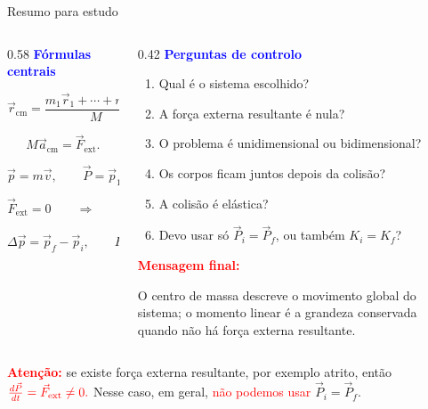 \documentclass{beamer}
\begin{document}
	
	\begin{frame}{Resumo para estudo}
		\scriptsize
		
		\begin{columns}[T]
			\begin{column}{0.58\textwidth}
				\textcolor{blue}{\textbf{Fórmulas centrais}}
				
				\[
				\vec r_{\text{cm}}=
				\frac{m_1\vec r_1+\cdots+m_n\vec r_n}{M},
				\qquad
				M=m_1+\cdots+m_n.
				\]
				
				\[
				M\vec a_{\text{cm}}=\vec F_{\text{ext}}.
				\]
				
				\[
				\vec p=m\vec v,
				\qquad
				\vec P=\vec p_1+\cdots+\vec p_n=M\vec v_{\text{cm}}.
				\]
				
				\[
				\vec F_{\text{ext}}=0
				\qquad \Rightarrow \qquad
				\vec P_i=\vec P_f.
				\]
				
				\[
				\Delta \vec p=\vec p_f-\vec p_i,
				\qquad
				F=\frac{\Delta p}{\Delta t}.
				\]
			\end{column}
			
			\begin{column}{0.42\textwidth}
				\textcolor{blue}{\textbf{Perguntas de controlo}}
				
				\begin{enumerate}
					\item Qual é o sistema escolhido?
					\item A força externa resultante é nula?
					\item O problema é unidimensional ou bidimensional?
					\item Os corpos ficam juntos depois da colisão?
					\item A colisão é elástica?
					\item Devo usar só \(\vec P_i=\vec P_f\), ou também \(K_i=K_f\)?
				\end{enumerate}
				
				\vspace{0.15cm}
				
				\textcolor{red}{\textbf{Mensagem final:}}
				
				O centro de massa descreve o movimento global do sistema; o momento linear é a grandeza conservada quando não há força externa resultante.
			\end{column}
		\end{columns}
		
		\vspace{0.3cm}
		
		{
			\textcolor{red}{\textbf{Atenção:}}
			se existe força externa resultante, por exemplo atrito, então
			$
			\textcolor{red}{
				\frac{d\vec P}{dt}=\vec F_{\text{ext}}\neq 0.}
		$
			Nesse caso, em geral, \textcolor{red}{não podemos usar} \(\vec P_i=\vec P_f\).
		}
		
	\end{frame}
	
\end{document}
